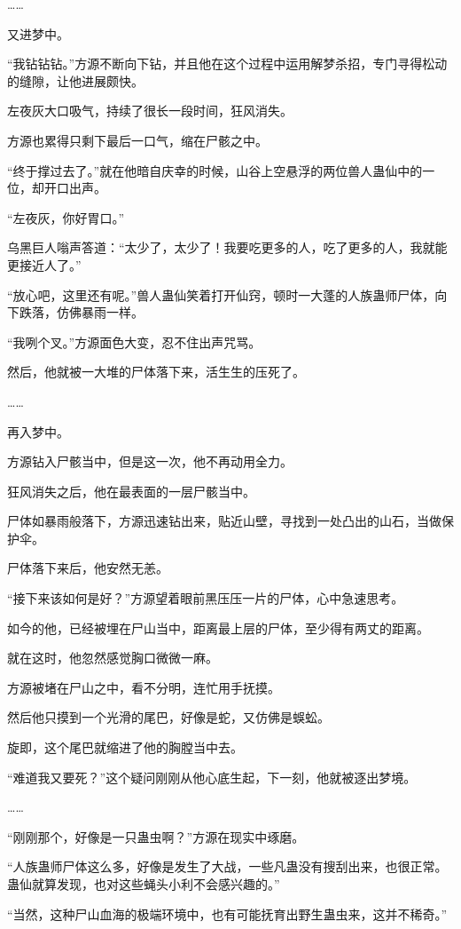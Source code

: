 \begin{this_body}
……

又进梦中。

“我钻钻钻。”方源不断向下钻，并且他在这个过程中运用解梦杀招，专门寻得松动的缝隙，让他进展颇快。

左夜灰大口吸气，持续了很长一段时间，狂风消失。

方源也累得只剩下最后一口气，缩在尸骸之中。

“终于撑过去了。”就在他暗自庆幸的时候，山谷上空悬浮的两位兽人蛊仙中的一位，却开口出声。

“左夜灰，你好胃口。”

乌黑巨人嗡声答道：“太少了，太少了！我要吃更多的人，吃了更多的人，我就能更接近人了。”

“放心吧，这里还有呢。”兽人蛊仙笑着打开仙窍，顿时一大蓬的人族蛊师尸体，向下跌落，仿佛暴雨一样。

“我咧个叉。”方源面色大变，忍不住出声咒骂。

然后，他就被一大堆的尸体落下来，活生生的压死了。

……

再入梦中。

方源钻入尸骸当中，但是这一次，他不再动用全力。

狂风消失之后，他在最表面的一层尸骸当中。

尸体如暴雨般落下，方源迅速钻出来，贴近山壁，寻找到一处凸出的山石，当做保护伞。

尸体落下来后，他安然无恙。

“接下来该如何是好？”方源望着眼前黑压压一片的尸体，心中急速思考。

如今的他，已经被埋在尸山当中，距离最上层的尸体，至少得有两丈的距离。

就在这时，他忽然感觉胸口微微一麻。

方源被堵在尸山之中，看不分明，连忙用手抚摸。

然后他只摸到一个光滑的尾巴，好像是蛇，又仿佛是蜈蚣。

旋即，这个尾巴就缩进了他的胸膛当中去。

“难道我又要死？”这个疑问刚刚从他心底生起，下一刻，他就被逐出梦境。

……

“刚刚那个，好像是一只蛊虫啊？”方源在现实中琢磨。

“人族蛊师尸体这么多，好像是发生了大战，一些凡蛊没有搜刮出来，也很正常。蛊仙就算发现，也对这些蝇头小利不会感兴趣的。”

“当然，这种尸山血海的极端环境中，也有可能抚育出野生蛊虫来，这并不稀奇。”


\end{this_body}
